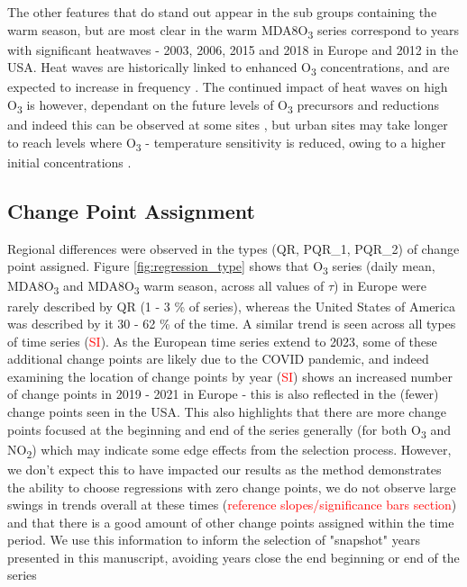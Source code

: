 \documentclass[journal abbreviation, manuscript]{copernicus}
\begin{document}
The other features that do stand out appear in the sub groups containing the warm season, but are most clear in the warm MDA8O\textsubscript{3} series correspond to years with significant heatwaves - 2003, 2006, 2015 and 2018 in Europe and 2012 in the USA. Heat waves are historically linked to enhanced O\textsubscript{3} concentrations, and are expected to increase in frequency \citep{Schär2004, Russo_2015, https://doi.org/10.1002/2016GL068432, Otero_2016, GOULDSBROUGH2022118975}. The continued impact of heat waves on high O\textsubscript{3} is however, dependant on the future levels of O\textsubscript{3} precursors and reductions and indeed this can be observed at some sites \citep{Meehl_2018, OTERO2021118334, acp-25-2725-2025, acp-25-5101-2025}, but urban sites may take longer to reach levels where O\textsubscript{3} - temperature sensitivity is reduced, owing to a higher initial concentrations \citep{VazquezSantiago2024}.


\subsection{Change Point Assignment} \label{sect:new_mda8_piecewise_types}

Regional differences were observed in the types (QR, PQR\_1, PQR\_2) of change point assigned. Figure \ref{fig:regression_type} shows that O\textsubscript{3} series (daily mean, MDA8O\textsubscript{3} and MDA8O\textsubscript{3} warm season, across all values of $\tau$) in Europe were rarely described by QR (1 - 3 \% of series), whereas the United States of America was described by it 30 - 62 \% of the time. A similar trend is seen across all types of time series (\textcolor{red}{SI}). As the European time series extend to 2023, some of these additional change points are likely due to the COVID pandemic, and indeed examining the location of change points by year (\textcolor{red}{SI}) shows an increased number of change points in 2019 - 2021 in Europe - this is also reflected in the (fewer) change points seen in the USA. This also highlights that there are more change points focused at the beginning and end of the series generally (for both O\textsubscript{3} and NO\textsubscript{2}) which may indicate some edge effects from the selection process. However, we don't expect this to have impacted our results as the method demonstrates the ability to choose regressions with zero change points, we do not observe large swings in trends overall at these times (\textcolor{red}{reference slopes/significance bars section}) and that there is a good amount of other change points assigned within the time period. We use this information to inform the selection of "snapshot" years presented in this manuscript, avoiding years close the end beginning or end of the series
 
\end{document}

